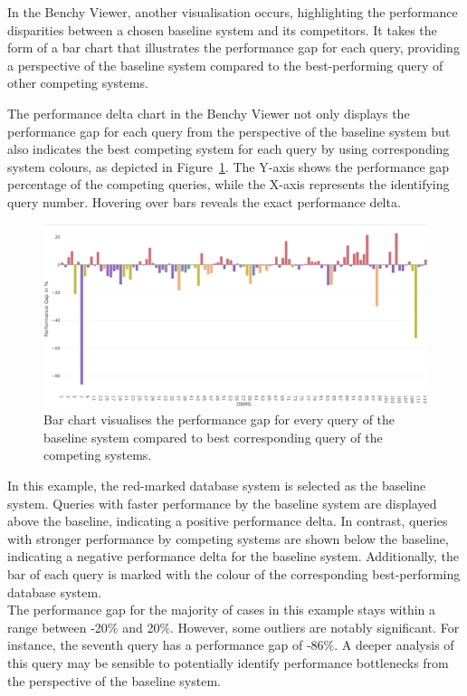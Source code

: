 In the Benchy Viewer, another visualisation occurs, highlighting the performance disparities between a chosen baseline system and its competitors. It takes the form of a bar chart that illustrates the performance gap for each query, providing a perspective of the baseline system compared to the best-performing query of other competing systems.

The performance delta chart in the Benchy Viewer not only displays the performance gap for each query from the perspective of the baseline system but also indicates the best competing system for each query by using corresponding system colours, as depicted in Figure~\ref{fig:performance-gap}. The Y-axis shows the performance gap percentage of the competing queries, while the X-axis represents the identifying query number. Hovering over bars reveals the exact performance delta.

\begin{figure}[h]
  \centering
  \includegraphics[width=1\linewidth]{figures/bsp-query-gaps.png}
  \caption{Bar chart visualises the performance gap for every query of the baseline system compared to best corresponding query of the competing systems.}
  \label{fig:performance-gap}
\end{figure}

In this example, the red-marked database system is selected as the baseline system. Queries with faster performance by the baseline system are displayed above the baseline, indicating a positive performance delta. In contrast, queries with stronger performance by competing systems are shown below the baseline, indicating a negative performance delta for the baseline system. Additionally, the bar of each query is marked with the colour of the corresponding best-performing database system.\\
The performance gap for the majority of cases in this example stays within a range between -20\% and 20\%. However, some outliers are notably significant. For instance, the seventh query has a performance gap of -86\%. A deeper analysis of this query may be sensible to potentially identify performance bottlenecks from the perspective of the baseline system.

